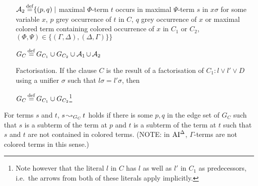 \documentclass[,%
	draft=false,%
	numbers=noendperiod
	11pt,
	a4paper,
	oneside,%
	openany,
]{memoir}
\begin{document}
\begin{defi}
\begin{itemize}
			$\operatorname{\mathcal{A}}_2 \operatorname{\stackrel{\mathrm{def}}{=}} \{ (p, q) \mid $ maximal $\Phi$-term $t$ occurs in maximal $\Psi$-term $s$ in $x\sigma$ for some variable $x$, $p$ grey occurrence of $t$ in $C$, $q$ grey occurrence of $x$ or maximal colored term containing colored occurrence of $x$ in $C_1$ or $C_2$,
			$(\Phi, \Psi) \in \{(\Gamma, \Delta), (\Delta, \Gamma)\} \} $


			$G_C \operatorname{\stackrel{\mathrm{def}}{=}} G_{C_1} \cup G_{C_2} \cup \operatorname{\mathcal{A}}_1 \cup \operatorname{\mathcal{A}}_2$


		\item[Factorisation.]
			If the clause $C$ is the result of a factorisation of $C_1: l \lor l' \lor D$ using a unifier $\sigma$ such that $l\sigma = l'\sigma$, then

			$G_C \operatorname{\stackrel{\mathrm{def}}{=}} G_{C_1} \cup G_{C_2}$\footnote{Note however that the literal $l$ in $C$ has $l$ as well as $l'$ in $C_1$ as predecessors, i.e.~the arrows from both of these literals apply implicitly.}
			\qedhere
	\end{itemize}
\end{defi}

\begin{defi}[$\apath$]
	For terms $s$ and $t$, $s\operatorname{\leadsto}_{G_C} t$ holds if there is some $p, q$ in the edge set of $G_C$ such that $s$ is a subterm of the term at $p$ and $t$ is a subterm of the term at $t$ such that $s$ and $t$ are not contained in colored terms. (NOTE: in $\operatorname{AI}^\Delta$, $\Gamma$-terms are not colored terms in this sense.)
\end{defi}

\begin{comment}
	\begin{lemma}
		Let $l$ and $l'$ be literals such that $\sigma = \mgu(l, l')$
		and let $\Lambda = l\lor l'$.

		Suppose a single-colored $\Phi$-term $s\occ{y}$ containing a variable $y$ occurs in $\Lambda\sigmaz{i-1}$ where $1\varleq i \varleq n$ and $\sigma_0 = \id$ such that 
		a variable $x$ occurs grey in $y\sigma_i$.
		Then in $\Lambda\sigmazi$, there is an occurrence of $x$ of at least one of the following forms:
		\begin{enumerate}
			\item A grey occurrence
			\item An occurrence in a single-colored $\Phi$-term
			\item [ col change ]
		\end{enumerate}

	\end{lemma}
\end{comment}
\end{document}
